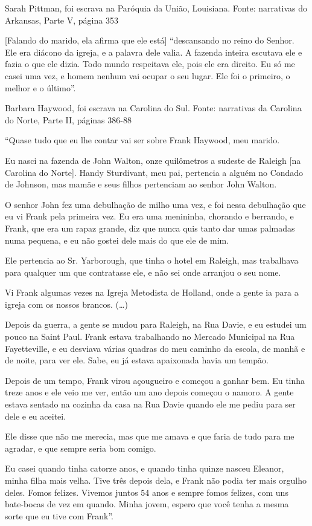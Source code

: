 Sarah Pittman, foi escrava na Paróquia da União, Louisiana. Fonte:
narrativas do Arkansas, Parte V, página 353

{[}Falando do marido, ela afirma que ele está{]} ``descansando no reino
do Senhor. Ele era diácono da igreja, e a palavra dele valia. A fazenda
inteira escutava ele e fazia o que ele dizia. Todo mundo respeitava ele,
pois ele era direito. Eu só me casei uma vez, e homem nenhum vai ocupar
o seu lugar. Ele foi o primeiro, o melhor e o último''.

Barbara Haywood, foi escrava na Carolina do Sul. Fonte: narrativas da
Carolina do Norte, Parte II, páginas 386-88

``Quase tudo que eu lhe contar vai ser sobre Frank Haywood, meu marido.

Eu nasci na fazenda de John Walton, onze quilômetros a sudeste de
Raleigh {[}na Carolina do Norte{]}. Handy Sturdivant, meu pai, pertencia
a alguém no Condado de Johnson, mas mamãe e seus filhos pertenciam ao
senhor John Walton.

O senhor John fez uma debulhação de milho uma vez, e foi nessa
debulhação que eu vi Frank pela primeira vez. Eu era uma menininha,
chorando e berrando, e Frank, que era um rapaz grande, diz que nunca
quis tanto dar umas palmadas numa pequena, e eu não gostei dele mais do
que ele de mim.

Ele pertencia ao Sr. Yarborough, que tinha o hotel em Raleigh, mas
trabalhava para qualquer um que contratasse ele, e não sei onde arranjou
o seu nome.

Vi Frank algumas vezes na Igreja Metodista de Holland, onde a gente ia
para a igreja com os nossos brancos. (\ldots{})

Depois da guerra, a gente se mudou para Raleigh, na Rua Davie, e eu
estudei um pouco na Saint Paul. Frank estava trabalhando no Mercado
Municipal na Rua Fayetteville, e eu desviava várias quadras do meu
caminho da escola, de manhã e de noite, para ver ele. Sabe, eu já estava
apaixonada havia um tempão.

Depois de um tempo, Frank virou açougueiro e começou a ganhar bem. Eu
tinha treze anos e ele veio me ver, então um ano depois começou o
namoro. A gente estava sentado na cozinha da casa na Rua Davie quando
ele me pediu para ser dele e eu aceitei.

Ele disse que não me merecia, mas que me amava e que faria de tudo para
me agradar, e que sempre seria bom comigo.

Eu casei quando tinha catorze anos, e quando tinha quinze nasceu
Eleanor, minha filha mais velha. Tive três depois dela, e Frank não
podia ter mais orgulho deles. Fomos felizes. Vivemos juntos 54 anos e
sempre fomos felizes, com uns bate-bocas de vez em quando. Minha jovem,
espero que você tenha a mesma sorte que eu tive com Frank''.


